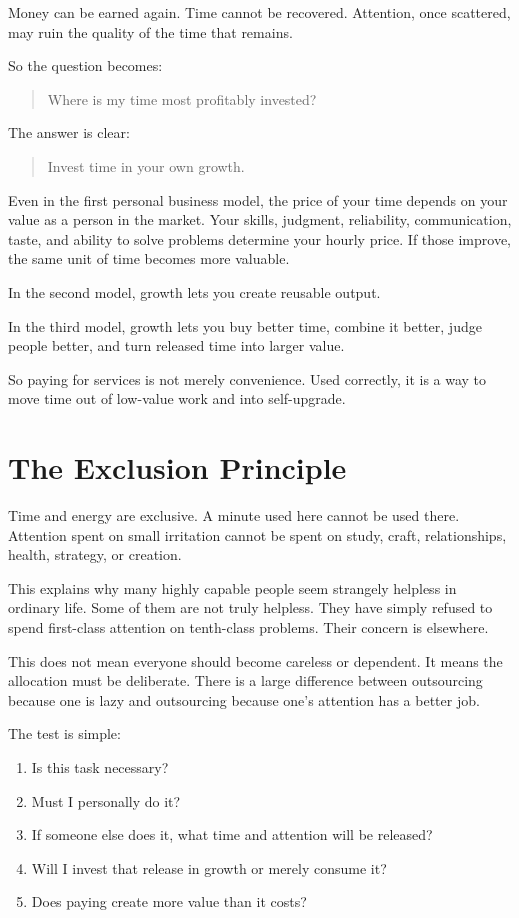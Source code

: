 Money can be earned again. Time cannot be recovered. Attention, once scattered, may ruin the quality of the time that remains.

So the question becomes:

\begin{quote}
Where is my time most profitably invested?
\end{quote}

The answer is clear:

\begin{quote}
Invest time in your own growth.
\end{quote}

Even in the first personal business model, the price of your time depends on your value as a person in the market. Your skills, judgment, reliability, communication, taste, and ability to solve problems determine your hourly price. If those improve, the same unit of time becomes more valuable.

In the second model, growth lets you create reusable output.

In the third model, growth lets you buy better time, combine it better, judge people better, and turn released time into larger value.

So paying for services is not merely convenience. Used correctly, it is a way to move time out of low-value work and into self-upgrade.

\section*{The Exclusion Principle}

Time and energy are exclusive. A minute used here cannot be used there. Attention spent on small irritation cannot be spent on study, craft, relationships, health, strategy, or creation.

This explains why many highly capable people seem strangely helpless in ordinary life. Some of them are not truly helpless. They have simply refused to spend first-class attention on tenth-class problems. Their concern is elsewhere.

This does not mean everyone should become careless or dependent. It means the allocation must be deliberate. There is a large difference between outsourcing because one is lazy and outsourcing because one's attention has a better job.

The test is simple:

\begin{enumerate}
\item Is this task necessary?
\item Must I personally do it?
\item If someone else does it, what time and attention will be released?
\item Will I invest that release in growth or merely consume it?
\item Does paying create more value than it costs?
\end{enumerate}

